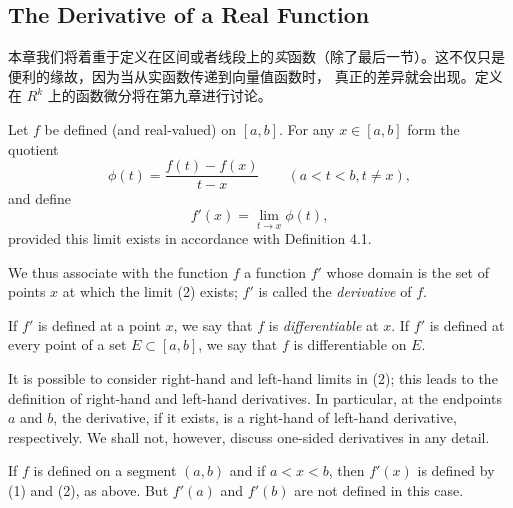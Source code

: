 \documentclass[../poma-notes.tex]{subfiles}
\begin{document}
\subsection*{The Derivative of a Real Function}

本章我们将着重于定义在区间或者线段上的\textit{实}函数（除了最后一节）。这不仅只是便利的缘故，因为当从实函数传递到向量值函数时，
真正的差异就会出现。定义在 $R^k$ 上的函数微分将在第九章进行讨论。

\begin{definition}
  Let $f$ be defined (and real-valued) on $[a, b]$. For any $x \in [a,b]$ form the quotient
  \begin{equation}
    \phi(t) = \frac{f(t) - f(x)}{t - x} \qquad (a<t<b, t \ne x),
  \end{equation}
  and define
  \begin{equation}
    f'(x) = \lim_{t \to x} \phi(t),
  \end{equation}
  provided this limit exists in accordance with Definition 4.1.

  We thus associate with the function $f$ a function $f'$ whose domain is the set of points $x$ at which the
  limit (2) exists; $f'$ is called the \textit{derivative} of $f$.

  If $f'$ is defined at a point $x$, we say that $f$ is \textit{differentiable} at $x$. If $f'$ is defined at
  every point of a set $E \subset [a,b]$, we say that $f$ is differentiable on $E$.

  It is possible to consider right-hand and left-hand limits in (2); this leads to the definition of right-hand
  and left-hand derivatives. In particular, at the endpoints $a$ and $b$, the derivative, if it exists, is a
  right-hand of left-hand derivative, respectively. We shall not, however, discuss one-sided derivatives in
  any detail.

  If $f$ is defined on a segment $(a, b)$ and if $a<x<b$, then $f'(x)$ is defined by (1) and (2), as above.
  But $f'(a)$ and $f'(b)$ are not defined in this case.
\end{definition}
\end{document}
